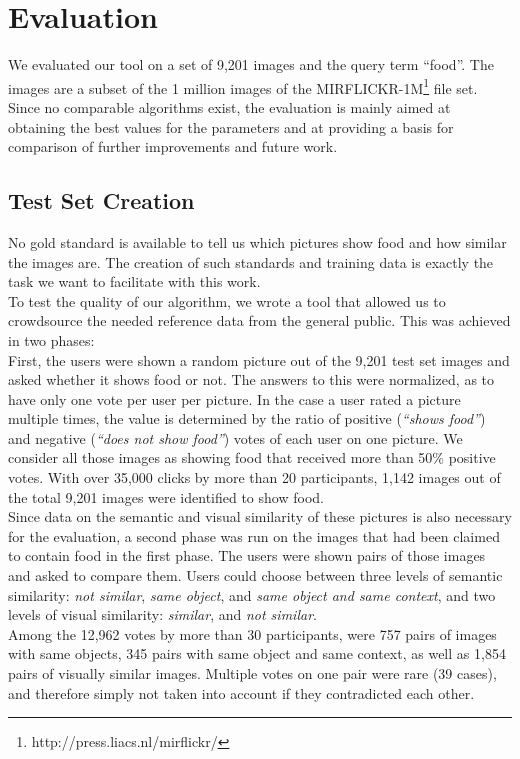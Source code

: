 %
\section{Evaluation}
\label{sec_evaluation}

We evaluated our tool on a set of 9,201 images and the query term ``food''. The images are a subset of the 1 million images of the MIRFLICKR-1M\footnote{http://press.liacs.nl/mirflickr/} file set. Since no comparable algorithms exist, the evaluation is mainly aimed at obtaining the best values for the parameters and at providing a basis for comparison of further improvements and future work.

\subsection{Test Set Creation}
\label{sec_testset}
No gold standard is available to tell us which pictures show food and how similar the images are. The creation of such standards and training data is exactly the task we want to facilitate with this work.\\
To test the quality of our algorithm, we wrote a tool that allowed us to crowdsource the needed reference data from the general public. This was achieved in two phases:\\

First, the users were shown a random picture out of the 9,201 test set images and asked whether it shows food or not. The answers to this were normalized, as to have only one vote per user per picture. In the case a user rated a picture multiple times, the value is determined by the ratio of positive (\emph{``shows food''}) and negative (\emph{``does not show food''}) votes of each user on one picture. We consider all those images as showing food that received more than 50\% positive votes. With over 35,000 clicks by more than 20 participants, 1,142 images out of the total 9,201 images were identified to show food.\\

Since data on the semantic and visual similarity of these pictures is also necessary for the evaluation, a second phase was run on the images that had been claimed to contain food in the first phase. The users were shown pairs of those images and  asked to compare them. Users could choose between three levels of semantic similarity: \emph{not similar}, \emph{same object}, and \emph{same object and same context}, and two levels of visual similarity: \emph{similar}, and \emph{not similar}.\\
Among the 12,962 votes by more than 30 participants, were 757 pairs of images with same objects, 345 pairs with same object and same context, as well as 1,854 pairs of visually similar images. Multiple votes on one pair were rare (39 cases), and therefore simply not taken into account if they contradicted each other.

